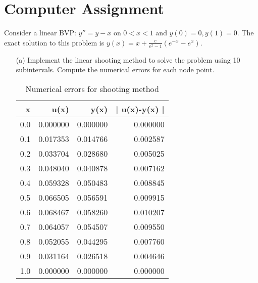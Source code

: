 \documentclass[10pt]{report}
\newcommand{\abs}[1] {\left| #1 \right|}
\begin{document}
\section*{Computer Assignment}
Consider a linear BVP: $y'' = y - x$ on $0<x<1$ and $y(0)=0, y(1)=0$. The exact solution to this problem is $y(x) = x + \frac{e}{e^2-1}(e^{-x}-e^x)$.
\begin{enumerate}
	\item [(a)]
	Implement the linear shooting method to solve the problem using 10 subintervals. Compute the numerical errors for each node point.
	
	\begin{table}[H]
		\centering
		\begin{tabular}{*{4}{N}} 
			\toprule
			x & u(x) & y(x) & \abs{u(x)-y(x)}\\  & 0.000000 & 0.000000 & 0.000000\\
			0.1 & 0.017353 & 0.014766 & 0.002587\\
			0.2 & 0.033704 & 0.028680 & 0.005025\\
			0.3 & 0.048040 & 0.040878 & 0.007162\\
			0.4 & 0.059328 & 0.050483 & 0.008845\\
			0.5 & 0.066505 & 0.056591 & 0.009915\\
			0.6 & 0.068467 & 0.058260 & 0.010207\\
			0.7 & 0.064057 & 0.054507 & 0.009550\\
			0.8 & 0.052055 & 0.044295 & 0.007760\\
			0.9 & 0.031164 & 0.026518 & 0.004646\\
			1.0 & 0.000000 & 0.000000 & 0.000000\\
			\bottomrule
		\end{tabular}
		\caption*{Numerical errors for shooting method}
	\end{table}
	

\end{enumerate}
\end{document}
